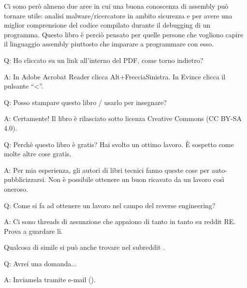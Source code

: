 Ci sono però almeno due aree in cui una buona conoscenza di assembly può tornare utile: analisi malware/ricercatore in ambito sicurezza e per avere una miglior comprensione del codice compilato durante il debugging di un programma.
Questo libro è perciò pensato per quelle persone che vogliono capire il linguaggio assembly piuttosto che imparare a programmare con esso.

\par Q: Ho cliccato su un link all'interno del PDF, come torno indietro?
\par A: In Adobe Acrobat Reader clicca Alt+FrecciaSinistra. In Evince clicca il pulsante ``<''.

\par Q: Posso stampare questo libro / usarlo per insegnare?
\par A: Certamente! Il libro è rilasciato sotto licenza Creative Commons (CC BY-SA 4.0).

\par Q: Perchè questo libro è gratis? Hai svolto un ottimo lavoro. È sospetto come molte altre cose gratis.
\par A: Per mia esperienza, gli autori di libri tecnici fanno queste cose per auto-pubblicizzarsi. Non è possibile ottenere un buon ricavato da un lavoro così oneroso.

\par Q: Come si fa ad ottenere un lavoro nel campo del reverse engineering?
\par A: Ci sono threads di assunzione che appaiono di tanto in tanto su reddit RE\FNURLREDDIT{}.
Prova a guardare lì.

Qualcosa di simile si può anche trovare nel subreddit .

\par Q: Avrei una domanda...
\par A: Inviamela tramite e-mail (\EMAILS).
